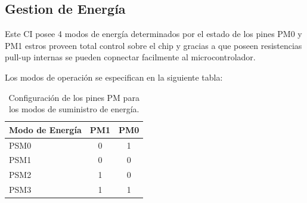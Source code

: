 \documentclass[letterpaper,12pt,oneside]{book}
\begin{document}
			\subsection{Gestion de Energía}
			Este CI posee 4 modos de energía determinados por el estado de los pines PM0 y PM1 estros proveen total control sobre el chip y gracias a que poseen resistencias pull-up internas se pueden copnectar facilmente al microcontrolador.

			Los modos de operación se especifican en la siguiente tabla:

			\begin{table}[!htpb]
				\centering
				\begin{tabular}{ l | c | c}
					\textbf{Modo de Energía} & \textbf{PM1} & \textbf{PM0}\\
					\hline
					PSM0 & 0 & 1 \\
					PSM1 & 0 & 0 \\
					PSM2 & 1 & 0 \\
					PSM3 & 1 & 1 \\
				\end{tabular}
				\caption[Modos de Suministro de Energía]{Configuración de los pines PM para los modos de suministro de energía.}
			\end{table}
\end{document}
